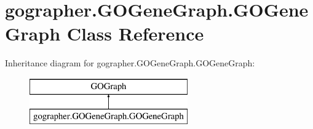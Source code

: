 \hypertarget{classgographer_1_1_g_o_gene_graph_1_1_g_o_gene_graph}{\section{gographer.\-G\-O\-Gene\-Graph.\-G\-O\-Gene\-Graph Class Reference}
\label{classgographer_1_1_g_o_gene_graph_1_1_g_o_gene_graph}
}
Inheritance diagram for gographer.\-G\-O\-Gene\-Graph.\-G\-O\-Gene\-Graph\-:\begin{figure}[H]
\begin{center}
\leavevmode
\includegraphics[height=2.000000cm]{classgographer_1_1_g_o_gene_graph_1_1_g_o_gene_graph}
\end{center}
\end{figure}
